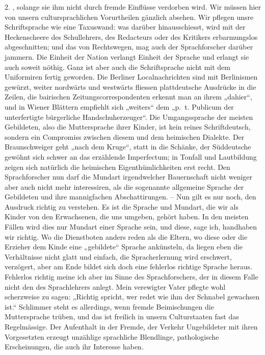 \begin{sloppypar}\label{II.III.handhabung} 2.  \label{fp.62}, solange sie ihm nicht durch fremde Einflüsse verdorben wird. Wir müssen hier von unsern cultursprachlichen Vorurtheilen gänzlich absehen. Wir pflegen unsre Schriftsprache wie eine Taxuswand: was darüber hinausschiesst, wird mit der Heckenscheere des Schullehrers, des Redacteurs oder des Kritikers erbarmungslos abgeschnitten; und das von Rechtswegen, mag auch der Sprachforscher darüber jammern. Die Einheit der Nation verlangt Einheit der Sprache und erlangt sie auch soweit nöthig. Ganz ist aber auch die Schriftsprache nicht mit dem Uniformiren fertig geworden. Die Berliner Localnachrichten sind mit Berlinismen gewürzt, weiter nordwärts und westwärts fliessen plattdeutsche Ausdrücke in die Zeilen, die bairischen Zeitungscorrespondenten erkennt man an ihrem „dahier“, und in Wiener Blättern empfiehlt sich „weiters“ dem „p.~t. Publicum der unterfertigte bürgerliche Handschuherzeuger“. Die Umgangssprache der meisten Gebildeten, also die Muttersprache ihrer Kinder, ist kein reines Schriftdeutsch, sondern ein Compromiss zwischen diesem und dem heimischen Dialekte. Der Braunschweiger geht „nach dem Kruge“, statt in die Schänke, der Süddeutsche gewöhnt sich schwer an das erzählende Imperfectum; in Tonfall und Lautbildung zeigen sich natürlich die heimischen Eigenthümlichkeiten erst recht. Den Sprachforscher nun darf die Mundart irgendwelcher Bauernschaft nicht weniger aber auch nicht mehr interessiren, als die sogenannte allgemeine Sprache der Gebildeten und ihre mannigfachen Abschattirungen. – Nun gilt es nur noch, den Ausdruck  richtig zu verstehen. Es ist die Sprache und Mundart, die wir als Kinder von den Erwachsenen, die uns umgeben, gehört haben. In den meisten Fällen wird dies nur  Mundart einer Sprache sein, und diese, sage ich, handhaben wir richtig. Wo die Dienstboten anders reden als die Eltern, wo diese oder die Erzieher dem Kinde eine „gebildete“ Sprache ankünsteln, da liegen eben die Verhältnisse nicht glatt und einfach, die Spracherlernung wird erschwert, verzögert, aber am Ende bildet sich doch eine fehlerlos richtige Sprache heraus. Fehlerlos richtig meine ich aber im Sinne des Sprachforschers, der in diesem Falle nicht den  des Sprachlehrers anlegt. Mein verewigter Vater pflegte wohl scherzweise zu sagen: „Richtig spricht, wer redet wie ihm der Schnabel gewachsen ist.“ Schlimmer steht es allerdings, wenn fremde Beimischungen die Muttersprache trüben, und das ist freilich in unsern Culturstaaten fast das Regelmässige. Der \label{fp.63} Aufenthalt in der Fremde, der Verkehr Ungebildeter mit ihren Vorgesetzten erzeugt unzählige sprachliche Blendlinge, pathologische Erscheinungen, die auch ihr Interesse haben.\end{sloppypar}

